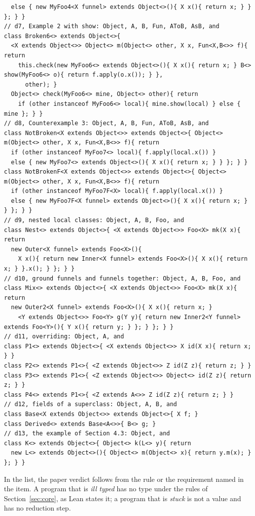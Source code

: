 \begin{lstlisting}
  else { new MyFoo4<X funnel> extends Object<>(){ X x(){ return x; } } }; } }
// d7, Example 2 with show: Object, A, B, Fun, AToB, AsB, and
class Broken6<> extends Object<>{
  <X extends Object<>> Object<> m(Object<> other, X x, Fun<X,B<>> f){ return
    this.check(new MyFoo6<> extends Object<>(){ X x(){ return x; } B<> show(MyFoo6<> o){ return f.apply(o.x()); } },
      other); }
  Object<> check(MyFoo6<> mine, Object<> other){ return
    if (other instanceof MyFoo6<> local){ mine.show(local) } else { mine }; } }
// d8, Counterexample 3: Object, A, B, Fun, AToB, AsB, and
class NotBroken<X extends Object<>> extends Object<>{ Object<> m(Object<> other, X x, Fun<X,B<>> f){ return
  if (other instanceof MyFoo7<> local){ f.apply(local.x()) }
  else { new MyFoo7<> extends Object<>(){ X x(){ return x; } } }; } }
class NotBrokenF<X extends Object<>> extends Object<>{ Object<> m(Object<> other, X x, Fun<X,B<>> f){ return
  if (other instanceof MyFoo7F<X> local){ f.apply(local.x()) }
  else { new MyFoo7F<X funnel> extends Object<>(){ X x(){ return x; } } }; } }
// d9, nested local classes: Object, A, B, Foo, and
class Nest<> extends Object<>{ <X extends Object<>> Foo<X> mk(X x){ return
  new Outer<X funnel> extends Foo<X>(){
    X x(){ return new Inner<X funnel> extends Foo<X>(){ X x(){ return x; } }.x(); } }; } }
// d10, ground funnels and funnels together: Object, A, B, Foo, and
class Mix<> extends Object<>{ <X extends Object<>> Foo<X> mk(X x){ return
  new Outer2<X funnel> extends Foo<X>(){ X x(){ return x; }
    <Y extends Object<>> Foo<Y> g(Y y){ return new Inner2<Y funnel> extends Foo<Y>(){ Y x(){ return y; } }; } }; } }
// d11, overriding: Object, A, and
class P1<> extends Object<>{ <X extends Object<>> X id(X x){ return x; } }
class P2<> extends P1<>{ <Z extends Object<>> Z id(Z z){ return z; } }
class P3<> extends P1<>{ <Z extends Object<>> Object<> id(Z z){ return z; } }
class P4<> extends P1<>{ <Z extends A<>> Z id(Z z){ return z; } }
// d12, fields of a superclass: Object, A, B, and
class Base<X extends Object<>> extends Object<>{ X f; }
class Derived<> extends Base<A<>>{ B<> g; }
// d13, the example of Section 4.3: Object, and
class K<> extends Object<>{ Object<> k(L<> y){ return
  new L<> extends Object<>(){ Object<> m(Object<> x){ return y.m(x); } }; } }
\end{lstlisting}
In the list, the paper verdict follows from the rule or the requirement named in the item.
A program that is \emph{ill typed} has no type under the rules of Section~\ref{sec:core}, as Lean states it; a program that is \emph{stuck} is not a value and has no reduction step.
